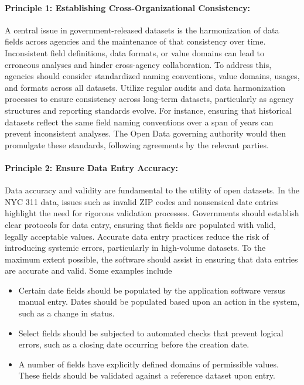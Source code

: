 \documentclass[linenumber]{jdsart}
\begin{document}
\paragraph{Principle 1: Establishing Cross-Organizational Consistency:}
A central issue in government-released datasets is the harmonization
of data fields across agencies and the maintenance of that consistency
over time. Inconsistent field definitions, data formats, or value
domains can lead to erroneous analyses and hinder 
cross-agency collaboration. To address this, agencies should consider 
standardized naming conventions, value domains, usages, and 
formats across all datasets. Utilize regular audits and data harmonization 
processes to ensure consistency 
across long-term datasets, particularly as agency structures 
and reporting standards evolve. For instance, ensuring that 
historical datasets reflect the same field naming conventions 
over a span of years can prevent inconsistent analyses. 
The Open Data governing authority would then promulgate 
these standards, following agreements by the relevant parties.

\paragraph{Principle 2: Ensure Data Entry Accuracy:}
Data accuracy and validity are fundamental to the utility of 
open datasets. In the NYC 311 data, issues such as 
invalid ZIP codes and nonsensical date entries 
highlight the need for rigorous validation processes. Governments 
should establish clear protocols for data entry, ensuring that 
fields are populated with valid, legally acceptable values. Accurate
data entry practices reduce the risk of introducing systemic errors,
particularly in high-volume datasets. To the maximum extent 
possible, the software should assist in ensuring that data 
entries are accurate and valid. Some examples include

\begin{itemize}[left=1.5em,itemsep=0.15\baselineskip]
    \item Certain date fields should be populated by the application software
     versus manual entry. Dates should be populated
    based upon an action in the system, such as a change in status.
    \item Select fields should be subjected to automated checks 
    that prevent logical errors, such as a closing date occurring before the creation date. 
    \item A number of fields have explicitly defined domains of permissible
    values. These fields should be validated against a reference dataset upon entry.
 \end{itemize}
\end{document}
